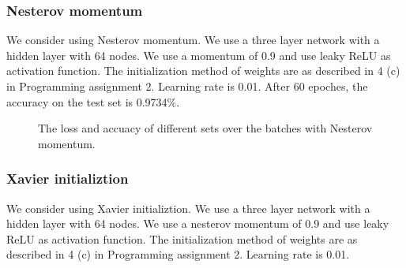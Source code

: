 \documentclass{article} %
\begin{document}
\subsubsection{Nesterov momentum}
We consider using Nesterov momentum. We use a three layer network with a hidden layer with 64 nodes. We use a momentum of 0.9 and use leaky ReLU as activation function. The initialization method of weights are as described in 4 (c) in Programming assignment 2. Learning rate is 0.01. After 60 epoches, the accuracy on the test set is 0.9734\%.

\begin{figure} [!htbp]
	
	\caption{The loss and accuacy of different sets over the batches with Nesterov momentum. }  
	
\end{figure}



\subsubsection{Xavier initializtion}
We consider using Xavier initializtion. We use a three layer network with a hidden layer with 64 nodes. We use a nesterov momentum of 0.9 and use leaky ReLU as activation function. The initialization method of weights are as described in 4 (c) in Programming assignment 2. Learning rate is 0.01.
\end{document}
